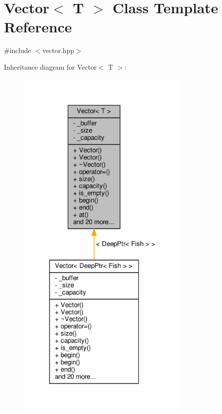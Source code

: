 \hypertarget{classVector}{}\section{Vector$<$ T $>$ Class Template Reference}
\label{classVector}


{\ttfamily \#include $<$vector.\+hpp$>$}



Inheritance diagram for Vector$<$ T $>$\+:\nopagebreak
\begin{figure}[H]
\begin{center}
\leavevmode
\includegraphics[width=242pt]{classVector__inherit__graph}
\end{center}
\end{figure}


